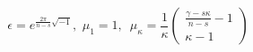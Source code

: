 \begin{equation}
\epsilon=e^{{\frac{2\pi}{n-s}}\sqrt{-1}},\,\,
\mu_{1}=1,\,\,\,\mu_{\kappa}=\frac{1}{\kappa}\left(\begin{array}{c}
\frac{\gamma -s \kappa}{n-s}-1\\ \kappa -1
\end{array}\right)
\end{equation}

